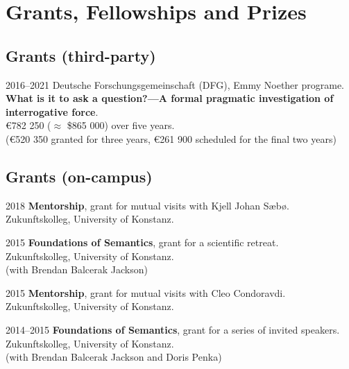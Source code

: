 \section*{Grants, Fellowships and Prizes}
\subsection*{Grants (third-party)}
\begin{dated}
	\item[2016--2021] 
		Deutsche Forschungsgemeinschaft (DFG), Emmy Noether programe.\\ 
		\textbf{What is it to ask a question?---A formal pragmatic investigation of interrogative force}.\\
		\euro 782 250 ($\approx$ \$865 000) over five years. \\
		(\euro 520 350 granted for three years, \euro 261 900 scheduled for the final two years)
\end{dated}
\subsection*{Grants (on-campus)}
\begin{dated}
	\item[2018]
		\textbf{Mentorship}, grant for mutual visits with Kjell Johan S{\ae}b{\o}.\\ 
		Zukunftskolleg, University of Konstanz.
	\item[2015] 
		\textbf{Foundations of Semantics}, grant for a scientific retreat.\\
		Zukunftskolleg, University of Konstanz.\\
		(with Brendan Balcerak Jackson)
	\item[2015]
		\textbf{Mentorship}, grant for mutual visits with Cleo Condoravdi.\\ 
		Zukunftskolleg, University of Konstanz.
	\item[2014--2015]
		 \textbf{Foundations of Semantics}, grant for a series of invited speakers.\\
		Zukunftskolleg, University of Konstanz.\\
		(with Brendan Balcerak Jackson and Doris Penka)\\
\end{dated}
